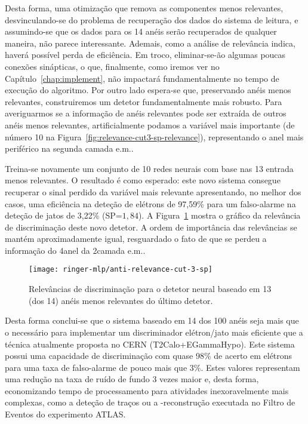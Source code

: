 Desta forma, uma otimização que remova as componentes menos relevantes,
desvinculando-se do problema de recuperação dos dados do sistema de leitura, e
assumindo-se que os dados para os 14 anéis serão recuperados de qualquer
maneira, não parece interessante. Ademais, como a análise de relevância
indica, haverá possível perda de eficiência. Em troco, eliminar-se-ão algumas
poucas conexões sinápticas, o que, finalmente, como iremos ver no
Capítulo~\ref{chap:implement}, não impactará fundamentalmente no tempo de
execução do algoritmo. Por outro lado espera-se que, preservando anéis menos
relevantes, construiremos um detetor fundamentalmente mais robusto. Para
averiguarmos se a informação de anéis relevantes pode ser extraída de outros
anéis menos relevantes, artificialmente podamos a variável mais importante (de
número 10 na Figura~\ref{fig:relevance-cut3-sp-relevance}), representando o
anel mais periférico na segunda camada e.m..

Treina-se novamente um conjunto de 10 redes neurais com base nas 13 entrada
menos relevantes. O resultado é como esperado: este novo sistema consegue
recuperar o sinal perdido da variável mais relevante apresentando, no melhor
dos casos, uma eficiência na deteção de elétrons de 97,59\% para um
falso-alarme na deteção de jatos de 3,22\% (SP=$1,84$). A
Figura~\ref{fig:anti-relev-cut-3-sp} mostra o gráfico da relevância de
discriminação deste novo detetor. A ordem de importância das relevâncias se
mantém aproximadamente igual, resguardado o fato de que se perdeu a informação
do 4\eiro anel da 2\eira camada e.m..

\begin{figure}
\begin{center}
\texttt{[image: ringer-mlp/anti-relevance-cut-3-sp]}
\end{center}
\caption{Relevâncias de discriminação para o detetor neural baseado em 13 (dos
14) anéis menos relevantes do último detetor.}
\label{fig:anti-relev-cut-3-sp}
\end{figure}

Desta forma conclui-se que o sistema baseado em 14 dos 100 anéis seja mais que
o necessário para implementar um discriminador elétron/jato mais eficiente que
a técnica atualmente proposta no CERN (T2Calo+EGammaHypo). Este sistema possui
uma capacidade de discriminação com quase 98\% de acerto em elétrons para uma
taxa de falso-alarme de pouco mais que 3\%. Estes valores representam uma
redução na taxa de ruído de fundo 3 vezes maior e, desta forma, economizando
tempo de processamento para atividades inexoravelmente mais complexas, como a
deteção de traços ou a -reconstrução executada no Filtro de Eventos
do experimento ATLAS.

